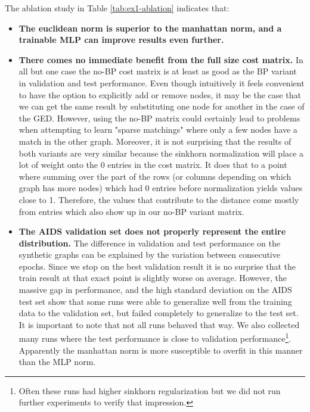 The ablation study in Table \ref{tab:ex1-ablation} indicates that:
\begin{itemize}
    \itemsep0em
    \item \textbf{The euclidean norm is superior to the manhattan norm, and a trainable MLP can improve results even further.}
    \item \textbf{There comes no immediate benefit from the full size cost matrix.} In all but one case the no-BP cost matrix is at least as good as the BP variant in validation and test performance. Even though intuitively it feels convenient to have the option to explicitly add or remove nodes, it may be the case that we can get the same result by substituting one node for another in the case of the GED. However, using the no-BP matrix could certainly lead to problems when attempting to learn "sparse matchings" where only a few nodes have a match in the other graph. Moreover, it is not surprising that the results of both variants are very similar because the sinkhorn normalization will place a lot of weight onto the 0 entries in the cost matrix. It does that to a point where summing over the part of the rows (or columns depending on which graph has more nodes) which had 0 entries before normalization yields values close to 1. Therefore, the values that contribute to the distance come mostly from entries which also show up in our no-BP variant matrix.
    \item \textbf{The AIDS validation set does not properly represent the entire distribution.} The difference in validation and test performance on the synthetic graphs can be explained by the variation between consecutive epochs. Since we stop on the best validation result it is no surprise that the train result at that exact point is slightly worse on average. However, the massive gap in performance, and the high standard deviation on the AIDS test set show that some runs were able to generalize well from the training data to the validation set, but failed completely to generalize to the test set. It is important to note that not all runs behaved that way. We also collected many runs where the test performance is close to validation performance\footnote{Often these runs had higher sinkhorn regularization but we did not run further experiments to verify that impression.}. Apparently the manhattan norm is more susceptible to overfit in this manner than the MLP norm.
\end{itemize}



